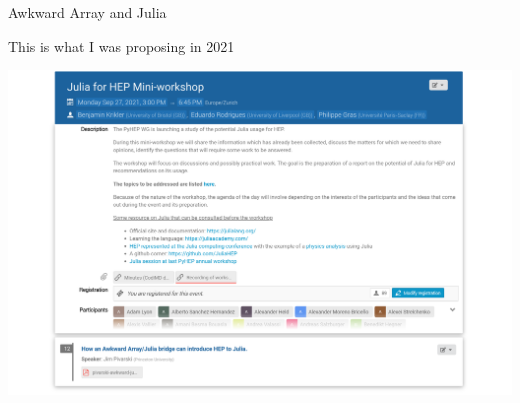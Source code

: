 \documentclass[aspectratio=169]{beamer}
\begin{document}
\begin{frame}{Awkward Array and Julia}
\vspace{0.2 cm}
\end{frame}

\begin{frame}{This is what I was proposing in 2021}
\vspace{0.1 cm}
\begin{center}
\includegraphics[width=0.88\linewidth]{juliahep-mini-workshop-2021.png}
\end{center}
\end{frame}
\end{document}

